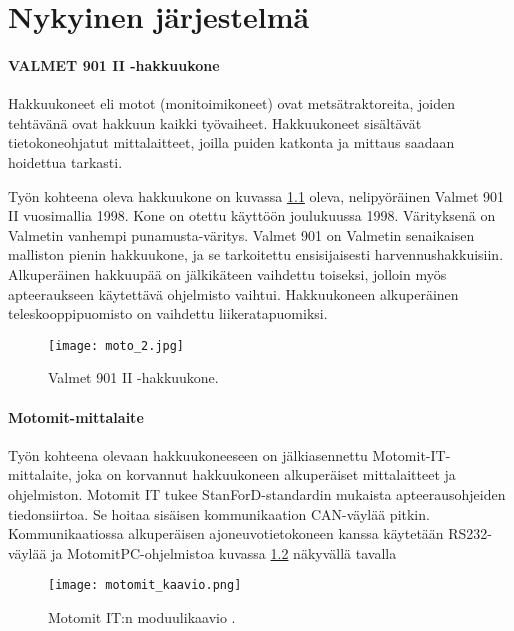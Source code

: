 \newpage

\chapter{Nykyinen järjestelmä}

\subsubsection{VALMET 901 II -hakkuukone}
Hakkuukoneet eli motot (monitoimikoneet) ovat metsätraktoreita, joiden tehtävänä ovat hakkuun kaikki työvaiheet. Hakkuukoneet sisältävät tietokoneohjatut mittalaitteet, joilla puiden katkonta ja mittaus saadaan hoidettua tarkasti.

Työn kohteena oleva hakkuukone on kuvassa \ref{hakkuukone} oleva, nelipyöräinen Valmet 901 II vuosimallia 1998. Kone on otettu käyttöön joulukuussa 1998. Värityksenä on Valmetin vanhempi punamusta-väritys. Valmet 901 on Valmetin senaikaisen malliston pienin hakkuukone, ja se tarkoitettu ensisijaisesti harvennushakkuisiin. Alkuperäinen hakkuupää on jälkikäteen vaihdettu toiseksi, jolloin myös apteeraukseen käytettävä ohjelmisto vaihtui. Hakkuukoneen alkuperäinen teleskooppipuomisto on vaihdettu liikeratapuomiksi.
\newline

\begin{figure}[H]
\centering
\texttt{[image: moto\_2.jpg]}
\caption{Valmet 901 II -hakkuukone.}
\label{hakkuukone}
\end{figure}

\subsubsection{Motomit-mittalaite}
Työn kohteena olevaan hakkuukoneeseen on jälkiasennettu Motomit-IT-mittalaite, joka on korvannut hakkuukoneen alkuperäiset mittalaitteet ja ohjelmiston. Motomit IT tukee StanForD-standardin mukaista apteerausohjeiden tiedonsiirtoa. Se hoitaa sisäisen kommunikaation CAN-väylää pitkin. Kommunikaatiossa alkuperäisen ajoneuvotietokoneen kanssa käytetään RS232-väylää ja MotomitPC-ohjelmistoa kuvassa \ref{motomit:modulikaavio} näkyvällä tavalla \citep{motomit:esite}
\newline

\begin{figure}[H]
\centering
\texttt{[image: motomit\_kaavio.png]}
\caption{Motomit IT:n moduulikaavio \cite{motomit:manual}.}
\label{motomit:modulikaavio}
\end{figure}
\newpage

